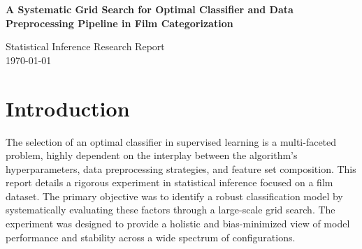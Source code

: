 \documentclass[11pt]{article}
\begin{document}
\begin{center}
    \vspace*{0.2\textheight}
    
    {\Huge\bfseries\color{accent}
    A Systematic Grid Search for Optimal Classifier and Data Preprocessing Pipeline in Film Categorization
    }
    
    \vspace{0.1\textheight}
    
    {\large
    Statistical Inference Research Report\\
    \vspace{0.5em}
    \today
    }
\end{center}

\vspace{0.1\textheight}

\begin{abstract}
    \noindent
    This study conducted a large-scale, systematic empirical comparison to identify an optimal classifier and preprocessing pipeline for a film categorization task. A comprehensive grid evaluation framework was employed to assess 60 unique model configurations, spanning six classifier families—Tree-Based, KNN, Probabilistic, SVM, Logistic Regression, and Neural Networks—each with finely-tuned hyperparameters. These were tested across five distinct outlier treatment strategies (isolation forest, quantile, robust scaling, winsorize, and an unclean baseline) and two feature set versions (full and reduced). Statistical analysis revealed significant performance differences compared to peer models, with large effect sizes (Cohen's d > 1.9) and p-values < 0.001. The isolation forest preprocessing with reduced feature set emerged as the optimal configuration, though perfect consistency across shuffles warrants methodological review.
\end{abstract}

\vspace{0.05\textheight}

\section{Introduction}

The selection of an optimal classifier in supervised learning is a multi-faceted problem, highly dependent on the interplay between the algorithm's hyperparameters, data preprocessing strategies, and feature set composition. This report details a rigorous experiment in statistical inference focused on a film dataset. The primary objective was to identify a robust classification model by systematically evaluating these factors through a large-scale grid search. The experiment was designed to provide a holistic and bias-minimized view of model performance and stability across a wide spectrum of configurations.
\end{document}
